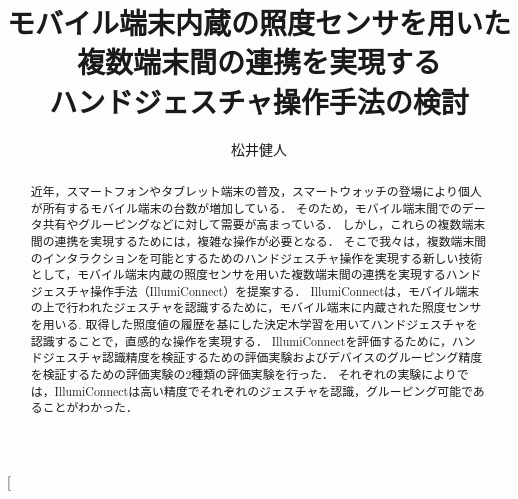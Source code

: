 \documentclass[a4j,9pt,twocolumn]{jsarticle}
\begin{document}
\twocolumn[


\title
{モバイル端末内蔵の照度センサを用いた複数端末間の連携を実現する\\
\hspace{22mm} ハンドジェスチャ操作手法の検討}%

\author{松井健人}


\endheader

\begin{abstract}
近年，スマートフォンやタブレット端末の普及，スマートウォッチの登場により個人が所有するモバイル端末の台数が増加している．
そのため，モバイル端末間でのデータ共有やグルーピングなどに対して需要が高まっている．
しかし，これらの複数端末間の連携を実現するためには，複雑な操作が必要となる．
そこで我々は，複数端末間のインタラクションを可能とするためのハンドジェスチャ操作を実現する新しい技術として，モバイル端末内蔵の照度センサを用いた複数端末間の連携を実現するハンドジェスチャ操作手法（IllumiConnect）を提案する．
IllumiConnectは，モバイル端末の上で行われたジェスチャを認識するために，モバイル端末に内蔵された照度センサを用いる.
取得した照度値の履歴を基にした決定木学習を用いてハンドジェスチャを認識することで，直感的な操作を実現する．
IllumiConnectを評価するために，ハンドジェスチャ認識精度を検証するための評価実験およびデバイスのグルーピング精度を検証するための評価実験の2種類の評価実験を行った．
それぞれの実験によりでは，IllumiConnectは高い精度でそれぞれのジェスチャを認識，グルーピング可能であることがわかった．
\end{abstract}
\vspace{3mm}

\end{document}
